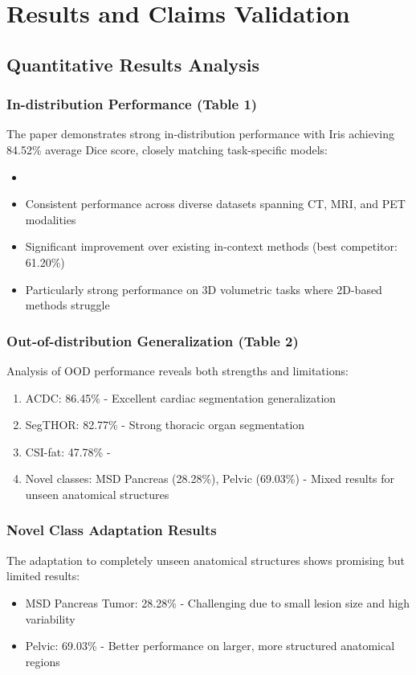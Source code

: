 \section{Results and Claims Validation}
\label{sec:results_validation}

\subsection{Quantitative Results Analysis}
\subsubsection{In-distribution Performance (Table 1)}
The paper demonstrates strong in-distribution performance with Iris achieving 84.52\% average Dice score, closely matching task-specific models:
\begin{itemize}
    \item {}
    \item Consistent performance across diverse datasets spanning CT, MRI, and PET modalities
    \item Significant improvement over existing in-context methods (best competitor: 61.20\%)
    \item Particularly strong performance on 3D volumetric tasks where 2D-based methods struggle
\end{itemize}

\subsubsection{Out-of-distribution Generalization (Table 2)}
Analysis of OOD performance reveals both strengths and limitations:
\begin{enumerate}
    \item ACDC: 86.45\% - Excellent cardiac segmentation generalization
    \item SegTHOR: 82.77\% - Strong thoracic organ segmentation
    \item CSI-fat: 47.78\% - 
    \item Novel classes: MSD Pancreas (28.28\%), Pelvic (69.03\%) - Mixed results for unseen anatomical structures
\end{enumerate}

\subsubsection{Novel Class Adaptation Results}
The adaptation to completely unseen anatomical structures shows promising but limited results:
\begin{itemize}
    \item MSD Pancreas Tumor: 28.28\% - Challenging due to small lesion size and high variability
    \item Pelvic: 69.03\% - Better performance on larger, more structured anatomical regions
\end{itemize}

